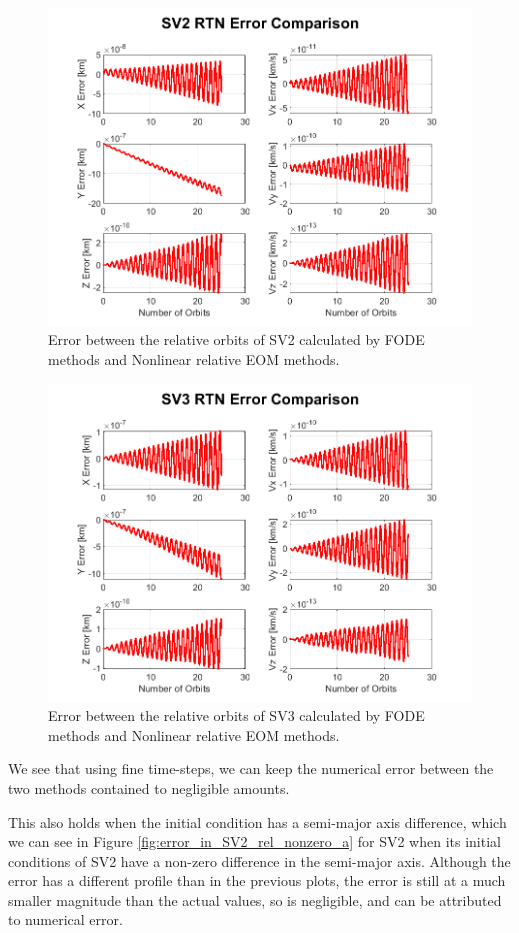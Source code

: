 \begin{figure}
    \centering
    \includegraphics[width=0.75\linewidth]{sim/figures/SV2_error_in_rel_methods.png}
    \caption{Error between the relative orbits of SV2 calculated by FODE methods and Nonlinear relative EOM methods.}
    \label{fig:error_in_SV2_rel}
\end{figure}

\begin{figure}
    \centering
    \includegraphics[width=0.75\linewidth]{sim/figures/SV3_error_in_rel_methods.png}
    \caption{Error between the relative orbits of SV3 calculated by FODE methods and Nonlinear relative EOM methods.}
    \label{fig:error_in_SV3_rel}
\end{figure}

We see that using fine time-steps, we can keep the numerical error between the two methods contained to negligible amounts.

This also holds when the initial condition has a semi-major axis difference, which we can see in Figure \ref{fig:error_in_SV2_rel_nonzero_a} for SV2 when its initial conditions of SV2 have a non-zero difference in the semi-major axis. Although the error has a different profile than in the previous plots, the error is still at a much smaller magnitude than the actual values, so is negligible, and can be attributed to numerical error.

